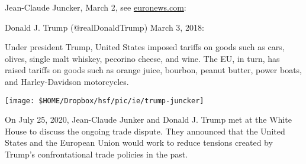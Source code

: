 Jean-Claude Juncker, March 2, see \href{https://www.euronews.com/embed/439899}{euronews.com}:
\medskip

Donald J. Trump (@realDonaldTrump) March 3, 2018:
\medskip	

\pbn
Under president Trump, United States imposed tariffs on goods such as cars, olives, single malt whiskey, pecorino cheese, and wine. The EU, in turn, has raised tariffs on goods such as orange juice, bourbon, peanut butter, power boats, and Harley-Davidson motorcycles.\medskip

\begin{center}
	\texttt{[image: \$HOME/Dropbox/hsf/pic/ie/trump-juncker]}
	\label{fig:trump-juncker}
\end{center}

On July 25, 2020, Jean-Claude Junker and Donald J. Trump met at the White House to discuss the ongoing trade dispute. They announced that the United States and the European Union would work to reduce tensions created by Trump's confrontational trade policies in the past.

\pbn
